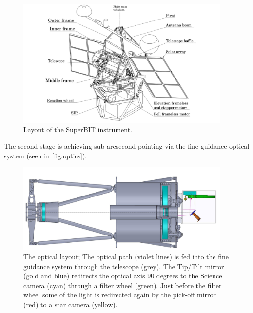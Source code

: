 \begin{figure}
    \begin{small}
        \begin{center}
            \includegraphics[width=0.95\textwidth]{Introduction/figs/bit_model.png}
        \end{center}
        \caption{Layout of the SuperBIT instrument.}
        \label{fig:bit}
    \end{small}
\end{figure}

The second stage is achieving sub-arcsecond pointing via the fine guidance optical system (seen in \autoref{fig:optics}). 

\begin{figure}
    \begin{small}
        \begin{center}
            \includegraphics[width=0.95\textwidth]{Introduction/figs/optical_path.png}
        \end{center}
        \caption{The optical layout; The optical path (violet lines) is fed into the fine guidance system through the telescope (grey). The Tip/Tilt mirror (gold and blue) redirects the optical axis 90 degrees to the Science camera (cyan) through a filter wheel (green). Just before the filter wheel some of the light is redirected again by the pick-off mirror (red) to a star camera (yellow).}
        \label{fig:optics}
    \end{small}
\end{figure}

